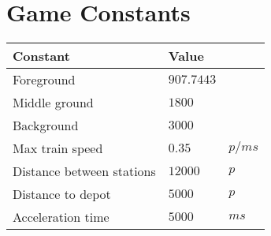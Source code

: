\chapter{Game Constants}

\begin{table}[H]
\centering
\begin{tabular}{| l | l l |}
\hline
\textbf{Constant} & \textbf{Value} & \\
\hline
Foreground & $907.7443$ &\\
Middle ground & $1800$ &\\
Background & $3000$ &\\
Max train speed & $0.35$ & $p/ms$\\
Distance between stations & $12000$ & $p$\\
Distance to depot & $5000$ & $p$\\
Acceleration time & $5000$ & $ms$\\
\hline
\end{tabular}
\end{table}
